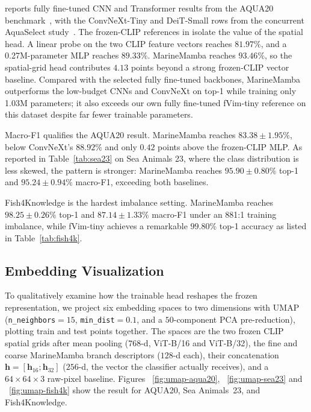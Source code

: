 \documentclass[runningheads]{llncs}
\begin{document}
 reports fully fine-tuned CNN and Transformer results from the AQUA20 benchmark~\cite{fuad2026aqua20}, with the ConvNeXt-Tiny and DeiT-Small rows from the concurrent AquaSelect study~\cite{daga2026aquaselect}. The frozen-CLIP references in  isolate the value of the spatial head. A linear probe on the two CLIP feature vectors reaches $81.97\%$, and a 0.27M-parameter MLP reaches $89.33\%$. MarineMamba reaches $93.46\%$, so the spatial-grid head contributes $4.13$ points beyond a strong frozen-CLIP vector baseline. Compared with the selected fully fine-tuned backbones, MarineMamba outperforms the low-budget CNNs and ConvNeXt on top-1 while training only 1.03M parameters; it also exceeds our own fully fine-tuned fVim-tiny reference on this dataset despite far fewer trainable parameters. 

Macro-F1 qualifies the AQUA20 result. MarineMamba reaches $83.38\pm1.95\%$, below ConvNeXt's $88.92\%$ and only $0.42$ points above the frozen-CLIP MLP. As reported in Table~\ref{tab:sea23} on Sea Animals 23, where the class distribution is less skewed, the pattern is stronger: MarineMamba reaches $95.90\pm0.80\%$ top-1 and $95.24\pm0.94\%$ macro-F1, exceeding both baselines.

Fish4Knowledge is the hardest imbalance setting. MarineMamba reaches $98.25\pm0.26\%$ top-1 and $87.14\pm1.33\%$ macro-F1 under an 881:1 training imbalance, while fVim-tiny achieves a remarkable $99.80\%$ top-1 accuracy as listed in Table~\ref{tab:fish4k}.



\subsection{Embedding Visualization}
\label{sec:umap}

To qualitatively examine how the trainable head reshapes the frozen representation, we project six embedding spaces to two dimensions with UMAP~\cite{mcinnes2018umap} (\texttt{n\_neighbors}$=15$, \texttt{min\_dist}$=0.1$, and a $50$-component PCA pre-reduction), plotting train and test points together. The spaces are the two frozen CLIP spatial grids after mean pooling ($768$-d, ViT-B/16 and ViT-B/32), the fine and coarse MarineMamba branch descriptors ($128$-d each), their concatenation $\mathbf{h}=[\mathbf{h}_{16};\mathbf{h}_{32}]$ ($256$-d, the vector the classifier actually receives), and a $64\times64\times3$ raw-pixel baseline. Figures ~\ref{fig:umap-aqua20}, ~\ref{fig:umap-sea23} and ~\ref{fig:umap-fish4k} show the result for AQUA20, Sea Animals~23, and Fish4Knowledge.
\end{document}
